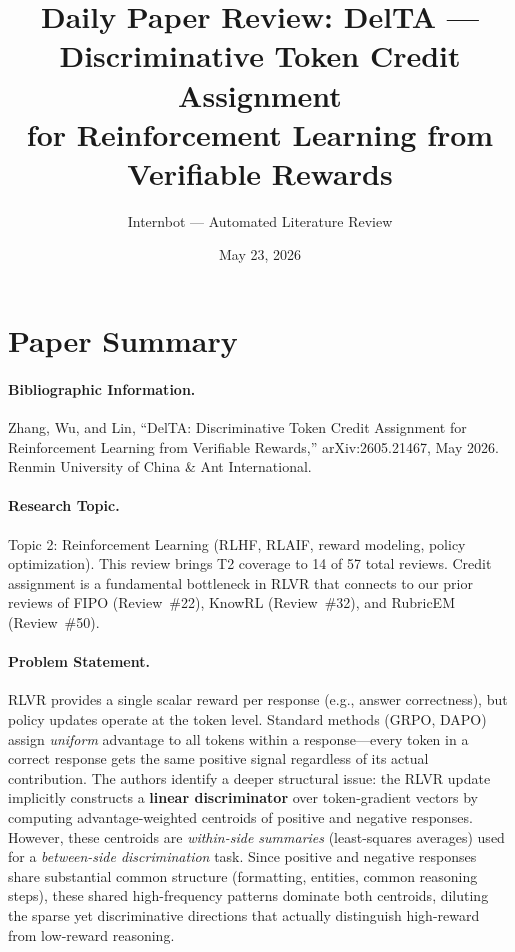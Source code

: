 \documentclass[11pt,a4paper]{article}
\title{Daily Paper Review: DelTA --- Discriminative Token Credit Assignment\\for Reinforcement Learning from Verifiable Rewards}
\author{Internbot --- Automated Literature Review}
\date{May 23, 2026}
\begin{document}
\maketitle

\section*{Paper Summary}

\paragraph{Bibliographic Information.}
Zhang, Wu, and Lin, ``DelTA: Discriminative Token Credit Assignment for Reinforcement Learning from Verifiable Rewards,'' arXiv:2605.21467, May 2026. Renmin University of China \& Ant International.

\paragraph{Research Topic.}
Topic 2: Reinforcement Learning (RLHF, RLAIF, reward modeling, policy optimization). This review brings T2 coverage to 14 of 57 total reviews. Credit assignment is a fundamental bottleneck in RLVR that connects to our prior reviews of FIPO (Review~\#22), KnowRL (Review~\#32), and RubricEM (Review~\#50).

\paragraph{Problem Statement.}
RLVR provides a single scalar reward per response (e.g., answer correctness), but policy updates operate at the token level. Standard methods (GRPO, DAPO) assign \emph{uniform} advantage to all tokens within a response---every token in a correct response gets the same positive signal regardless of its actual contribution. The authors identify a deeper structural issue: the RLVR update implicitly constructs a \textbf{linear discriminator} over token-gradient vectors by computing advantage-weighted centroids of positive and negative responses. However, these centroids are \emph{within-side summaries} (least-squares averages) used for a \emph{between-side discrimination} task. Since positive and negative responses share substantial common structure (formatting, entities, common reasoning steps), these shared high-frequency patterns dominate both centroids, diluting the sparse yet discriminative directions that actually distinguish high-reward from low-reward reasoning.
\end{document}
